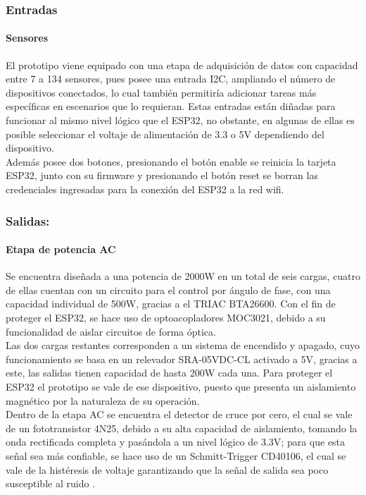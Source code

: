 	\subsubsection{Entradas}
	\paragraph{Sensores}
		El prototipo viene equipado con una etapa de adquisición de datos con capacidad entre 7 a 134 sensores, pues posee una entrada I2C, ampliando el número de dispositivos conectados, lo cual también permitiría adicionar tareas más específicas en escenarios que lo requieran. Estas entradas están diñadas para funcionar al mismo nivel lógico que el ESP32, no obstante, en algunas de ellas es posible seleccionar el voltaje de alimentación de 3.3 o 5V dependiendo del dispositivo.\\
		
		Además posee dos botones, presionando el botón enable se reinicia la tarjeta ESP32, junto con su firmware y presionando el botón reset se borran las credenciales ingresadas para la conexión del ESP32 a la red wifi.\\
	
		
	\subsubsection{Salidas:}
	\paragraph{Etapa de potencia AC}
		Se encuentra diseñada a una potencia de 2000W en un total de seis cargas, cuatro de ellas cuentan con un circuito para el control por ángulo de fase, con una capacidad individual de 500W, gracias a el TRIAC BTA26600. Con el fin de proteger el ESP32, se hace uso de optoacopladores MOC3021, debido a su funcionalidad de aislar circuitos de forma óptica.\\
	
		Las dos cargas restantes corresponden a un sistema de encendido y apagado, cuyo funcionamiento se basa en un relevador SRA-05VDC-CL activado a 5V, gracias a este, las salidas tienen capacidad de hasta 200W cada una. Para proteger el ESP32 el prototipo se vale de ese dispositivo, puesto que presenta un aislamiento magnético por la naturaleza de su operación.\\
			
		Dentro de la etapa AC se encuentra el detector de cruce por cero, el cual se vale de un fototransistor 4N25, debido a su alta capacidad de aislamiento, tomando la onda rectificada completa y pasándola a un nivel lógico de 3.3V; para que esta señal sea más confiable, se hace uso de un Schmitt-Trigger CD40106, el cual se vale de la histéresis de voltaje garantizando que la señal de salida sea poco susceptible al ruido \cite{DC0}.\\
	
